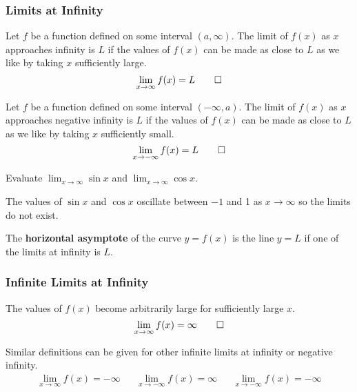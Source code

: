 \subsubsection{Limits at Infinity}
\begin{definition}
    Let \(f\) be a function defined on some interval \((a,\infty)\).
    The limit of \(f(x)\) as \(x\) approaches infinity is \(L\) if the values
    of \(f(x)\) can be made as close to \(L\) as we like by taking \(x\)
    sufficiently large.
    \[\lim_{x\to\infty}f(x)=L \qedhere\]
\end{definition}
\begin{definition}
    Let \(f\) be a function defined on some interval \((-\infty,a)\).
    The limit of \(f(x)\) as \(x\) approaches negative infinity is \(L\) if
    the values of \(f(x)\) can be made as close to \(L\) as we like by taking
    \(x\) sufficiently small.
    \[\lim_{x\to -\infty}f(x)=L \qedhere\]
\end{definition}
\begin{problem}
    Evaluate \(\lim_{x\to\infty}\sin x\) and \(\lim_{x\to\infty}\cos x\).
\end{problem}
\begin{solution}
    The values of \(\sin x\) and \(\cos x\) oscillate between \(-1\) and 1 as
    \(x\to\infty\) so the limits do not exist.
\end{solution}
\begin{definition}
    The \textbf{horizontal asymptote} of the curve \(y=f(x)\) is the line
    \(y=L\) if one of the limits at infinity is \(L\).
\end{definition}

\subsubsection{Infinite Limits at Infinity}
\begin{definition}
    The values of \(f(x)\) become arbitrarily large for sufficiently large
    \(x\).
    \[\lim_{x\to\infty}f(x)=\infty \qedhere\]
\end{definition}
Similar definitions can be given for other infinite limits at infinity or
negative infinity.
\begin{align*}
    &\lim_{x\to\infty}f(x)=-\infty&&\lim_{x\to -\infty}f(x)=\infty&
    &\lim_{x\to -\infty}f(x)=-\infty&
\end{align*}


